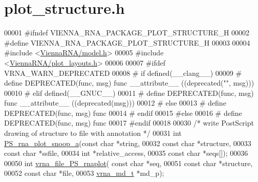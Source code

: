 \hypertarget{plot__structure_8h_source}{}\section{plot\+\_\+structure.\+h}
\label{plot__structure_8h_source}

\begin{DoxyCode}
00001 \textcolor{preprocessor}{#ifndef VIENNA\_RNA\_PACKAGE\_PLOT\_STRUCTURE\_H}
00002 \textcolor{preprocessor}{#define VIENNA\_RNA\_PACKAGE\_PLOT\_STRUCTURE\_H}
00003 
00004 \textcolor{preprocessor}{#include <\hyperlink{model_8h}{ViennaRNA/model.h}>}
00005 \textcolor{preprocessor}{#include <\hyperlink{plot__layouts_8h}{ViennaRNA/plot\_layouts.h}>}
00006 
00007 \textcolor{preprocessor}{#ifdef VRNA\_WARN\_DEPRECATED}
00008 \textcolor{preprocessor}{# if defined(\_\_clang\_\_)}
00009 \textcolor{preprocessor}{#  define DEPRECATED(func, msg) func \_\_attribute\_\_ ((deprecated("", msg)))}
00010 \textcolor{preprocessor}{# elif defined(\_\_GNUC\_\_)}
00011 \textcolor{preprocessor}{#  define DEPRECATED(func, msg) func \_\_attribute\_\_ ((deprecated(msg)))}
00012 \textcolor{preprocessor}{# else}
00013 \textcolor{preprocessor}{#  define DEPRECATED(func, msg) func}
00014 \textcolor{preprocessor}{# endif}
00015 \textcolor{preprocessor}{#else}
00016 \textcolor{preprocessor}{# define DEPRECATED(func, msg) func}
00017 \textcolor{preprocessor}{#endif}
00018 
00030 \textcolor{comment}{/* write PostScript drawing of structure to file with annotation */}
00031 \textcolor{keywordtype}{int} \hyperlink{plot__structure_8h_a6d0abe209468084b5a24c837e2d222a6}{PS\_rna\_plot\_snoop\_a}(\textcolor{keyword}{const} \textcolor{keywordtype}{char} *\textcolor{keywordtype}{string},
00032                         \textcolor{keyword}{const} \textcolor{keywordtype}{char} *structure,
00033                         \textcolor{keyword}{const} \textcolor{keywordtype}{char} *ssfile,
00034                         \textcolor{keywordtype}{int} *relative\_access,
00035                         \textcolor{keyword}{const} \textcolor{keywordtype}{char} *seqs[]);
00036 
00050 \textcolor{keywordtype}{int} \hyperlink{plot__structure_8h_abdc8f6548ba4a3bc3cd868ccbcfdb86a}{vrna\_file\_PS\_rnaplot}( \textcolor{keyword}{const} \textcolor{keywordtype}{char} *seq,
00051                           \textcolor{keyword}{const} \textcolor{keywordtype}{char} *structure,
00052                           \textcolor{keyword}{const} \textcolor{keywordtype}{char} *file,
00053                           \hyperlink{group__model__details_structvrna__md__s}{vrna\_md\_t}  *md\_p);

\end{DoxyCode}
